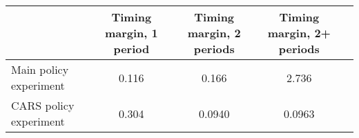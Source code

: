 \begin{comment}
\begin{tabular}{p{2.5cm}p{1.5cm}p{1.5cm}p{1.5cm}p{1.5cm}}
\hline\hline
                    &Total timing margin, 1 period&Total timing margin, 2 periods&Total timing margin, 2+ periods&Net extensive margin\\
\hline
Main policy experiment&       0.116&       0.166&       2.736&       1.351\\
CARS policy experiment&       0.304&      0.0940&      0.0963&      -0.119\\
\hline\hline
\end{tabular}
\end{comment}

\begin{tabular}{l c c c c }
\hline\hline
                    &Timing margin, 1 period&Timing margin, 2 periods&Timing margin, 2+ periods\\
\hline
Main policy experiment&       0.116&       0.166&       2.736\\
CARS policy experiment&       0.304&      0.0940&      0.0963\\
\hline\hline
\end{tabular}

